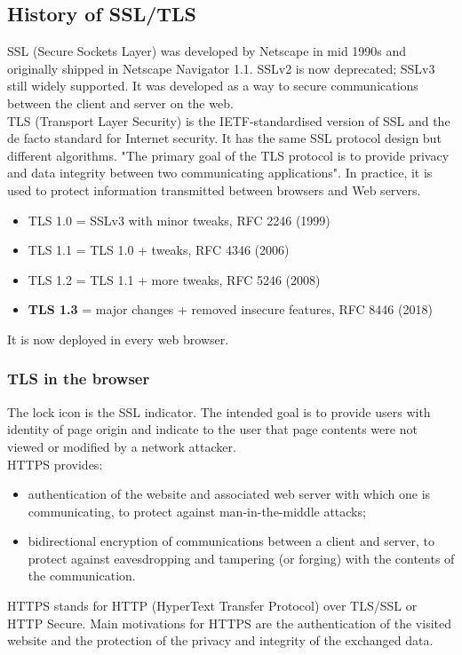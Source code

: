 \documentclass[a4paper, 10pt, titlepage]{article}
\begin{document}
\subsection{History of SSL/TLS}
SSL (Secure Sockets Layer) was developed by Netscape in mid 1990s and originally shipped in Netscape Navigator 1.1. SSLv2 is now deprecated; SSLv3 still widely supported. It was developed as a way to secure communications between the client and server on the web. \medskip\\
TLS (Transport Layer Security) is the IETF-standardised version of SSL and the de facto standard for Internet security.
It has the same SSL protocol design but different algorithms. "The primary goal of the TLS protocol is to provide privacy and data integrity between two communicating applications". In practice, it is used to protect information transmitted between browsers and Web servers.
\begin{itemize}
\item TLS 1.0 = SSLv3 with minor tweaks, RFC 2246 (1999)
\item TLS 1.1 = TLS 1.0 + tweaks, RFC 4346 (2006)
\item TLS 1.2 = TLS 1.1 + more tweaks, RFC 5246 (2008)
\item \textbf{TLS 1.3} = major changes + removed insecure features, RFC 8446 (2018)
\end{itemize}
It is now deployed in every web browser.

\subsubsection{TLS in the browser}
The lock icon is the SSL indicator. The intended goal is to provide users with identity of page origin and indicate to the user that page contents were not viewed or modified by a network attacker.\\
HTTPS provides:
\begin{itemize}
\item authentication of the website and associated web server with which one is communicating, to protect against man-in-the-middle attacks;
\item bidirectional encryption of communications between a client and server, to protect against eavesdropping and tampering (or forging) with the contents of the communication.
\end{itemize}
HTTPS stands for HTTP (HyperText Transfer Protocol) over TLS/SSL or HTTP Secure. Main motivations for HTTPS are the authentication of the visited website and the protection of the privacy and integrity of the exchanged data.
\end{document}
